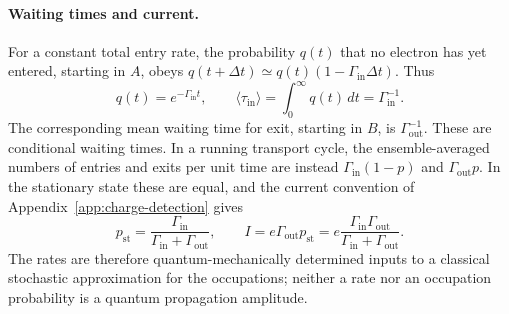 \paragraph{Waiting times and current.}
For a constant total entry rate, the probability $q(t)$ that no
electron has yet entered, starting in $A$, obeys
$q(t+\Delta t)\simeq q(t)(1-\Gamma_{\mathrm{in}}\Delta t)$.
Thus
\begin{equation}
 q(t)=e^{-\Gamma_{\mathrm{in}}t},\qquad
 \langle\tau_{\mathrm{in}}\rangle
   =\int_0^\infty q(t)\,dt=\Gamma_{\mathrm{in}}^{-1}.
 \label{eq:rates-waiting-time}
\end{equation}
The corresponding mean waiting time for exit, starting in $B$,
is $\Gamma_{\mathrm{out}}^{-1}$. These are conditional waiting
times. In a running transport cycle, the ensemble-averaged numbers
of entries and exits per unit time are instead
$\Gamma_{\mathrm{in}}(1-p)$ and $\Gamma_{\mathrm{out}}p$.
In the stationary state these are equal, and the current convention
of Appendix~\ref{app:charge-detection} gives
\begin{equation}
 p_{\mathrm{st}}=\frac{\Gamma_{\mathrm{in}}}
                         {\Gamma_{\mathrm{in}}+\Gamma_{\mathrm{out}}},
 \qquad
 I=e\Gamma_{\mathrm{out}}p_{\mathrm{st}}
   =e\frac{\Gamma_{\mathrm{in}}\Gamma_{\mathrm{out}}}
                 {\Gamma_{\mathrm{in}}+\Gamma_{\mathrm{out}}}.
 \label{eq:rates-stationary-current}
\end{equation}
The rates are therefore quantum-mechanically determined inputs
to a classical stochastic approximation for the occupations;
neither a rate nor an occupation probability is a quantum
propagation amplitude.
